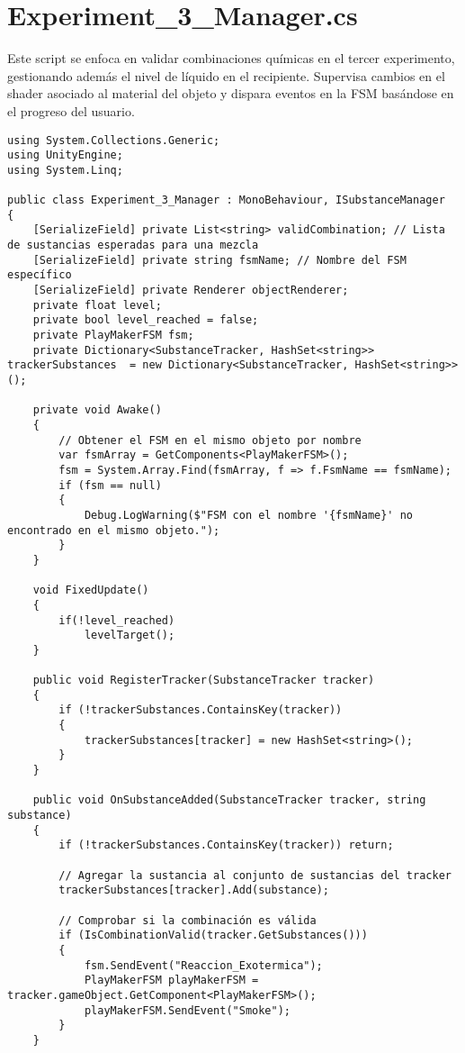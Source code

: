 \section{Experiment\_3\_Manager.cs}\label{script:Experiment3Manager}
Este script se enfoca en validar combinaciones químicas en el tercer experimento, gestionando además el nivel de líquido en el recipiente. Supervisa cambios en el shader asociado al material del objeto y dispara eventos en la FSM basándose en el progreso del usuario.
\begin{verbatim}
using System.Collections.Generic;
using UnityEngine;
using System.Linq;

public class Experiment_3_Manager : MonoBehaviour, ISubstanceManager
{
    [SerializeField] private List<string> validCombination; // Lista de sustancias esperadas para una mezcla
    [SerializeField] private string fsmName; // Nombre del FSM específico
    [SerializeField] private Renderer objectRenderer;
    private float level;
    private bool level_reached = false;
    private PlayMakerFSM fsm;
    private Dictionary<SubstanceTracker, HashSet<string>> trackerSubstances  = new Dictionary<SubstanceTracker, HashSet<string>>();

    private void Awake() 
    {
        // Obtener el FSM en el mismo objeto por nombre
        var fsmArray = GetComponents<PlayMakerFSM>();
        fsm = System.Array.Find(fsmArray, f => f.FsmName == fsmName);
        if (fsm == null)
        {
            Debug.LogWarning($"FSM con el nombre '{fsmName}' no encontrado en el mismo objeto.");
        }
    }

    void FixedUpdate()
    {
        if(!level_reached)
            levelTarget();
    }

    public void RegisterTracker(SubstanceTracker tracker)
    {
        if (!trackerSubstances.ContainsKey(tracker))
        {
            trackerSubstances[tracker] = new HashSet<string>();
        }
    }

    public void OnSubstanceAdded(SubstanceTracker tracker, string substance)
    {
        if (!trackerSubstances.ContainsKey(tracker)) return;

        // Agregar la sustancia al conjunto de sustancias del tracker
        trackerSubstances[tracker].Add(substance);

        // Comprobar si la combinación es válida
        if (IsCombinationValid(tracker.GetSubstances()))
        {
            fsm.SendEvent("Reaccion_Exotermica");
            PlayMakerFSM playMakerFSM = tracker.gameObject.GetComponent<PlayMakerFSM>();
            playMakerFSM.SendEvent("Smoke");
        }
    }


\end{verbatim}

